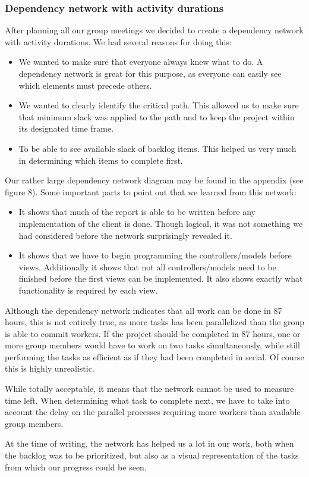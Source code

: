 \subsubsection{Dependency network with activity durations}
After planning all our group meetings we decided to create a dependency network with activity durations. We had several reasons for doing this:

\begin{itemize}
	\item We wanted to make sure that everyone always knew what to do. A dependency network is great for this purpose, as everyone can easily see which elements must precede others.
	\item We wanted to clearly identify the critical path. This allowed us to make sure that minimum slack was applied to the path and to keep the project within its designated time frame.
	\item To be able to see available slack of backlog items. This helped us very much in determining which items to complete first.
\end{itemize}

Our rather large dependency network diagram may be found in the appendix (see figure 8).
Some important parts to point out that we learned from this network:

\begin{itemize}
	\item It shows that much of the report is able to be written before any implementation of the client is done. Though logical, it was not something we had considered before the network surprisingly revealed it.
	
	\item It shows that we have to begin programming the controllers/models before views. Additionally it shows that not all controllers/models need to be finished before the first views can be implemented. It also shows exactly what functionality is required by each view.
\end{itemize}

Although the dependency network indicates that all work can be done in 87 hours, this is not entirely true, as more tasks has been parallelized than the group is able to commit workers. If the project should be completed in 87 hours, one or more group members would have to work on two tasks simultaneously, while still performing the tasks as efficient as if they had been completed in serial. Of course this is highly unrealistic.

While totally acceptable, it means that the network cannot be used to measure time left. When determining what task to complete next, we have to take into account the delay on the parallel processes requiring more workers than available group members.

At the time of writing, the network has helped us a lot in our work, both when the backlog was to be prioritized, but also as a visual representation of the tasks from which our progress could be seen.